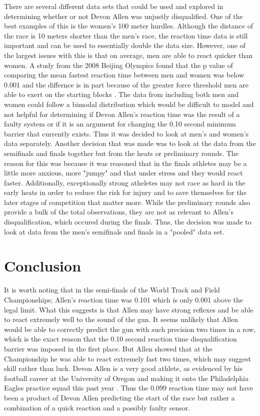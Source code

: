 \documentclass[12pt, letterpaper, titlepage]{article}
\begin{document}
There are several different data sets that could be used and explored in determining 
whether or not Devon Allen was unjustly disqualified.  One of the best examples of this
is the women's 100 meter hurdles. Although the distance of the race is 10 meters shorter
than the men's race, the reaction time data is still important and can be used to
essentially double the data size.  However, one of the largest issues with this is that on average, men are able to react quicker than women.  A study from the 2008 Beijing Olympics found that the p value of comparing the mean fastest reaction time between men and women was below 0.001 and the differnce is in part because of the greater force threshold men are able to exert on the starting blocks \citep{Lipps}. The data from including both men and women could follow a bimodal distribution which would be difficult to model and not helpful for determining if Devon Allen's reaction time was the result of a faulty system or if it is an argument
for changing the 0.10 second minimum barrier that currently exists.  Thus it was decided
to look at men's and women's data separately.  Another decision that was made was to look
at the data from the semifinals and finals together but from the heats or preliminary rounds.  The reason for this was because it was reasoned that in the finals athletes may
be a little more anxious, more "jumpy" and that under stress and they would react faster.
Additionally, exceptionally strong atheletes may not race as hard in the early heats in
order to reduce the risk for injury and to save themselves for the later stages of
competition that matter more. While the preliminary rounds also provide a bulk of the total observations, they are not as relevant to Allen's disqualification, which occured during the finals.  Thus, the decision was made to look at data from the men's semifinals
and finals in a "pooled" data set.



\section{Conclusion}
\label{sec:conclusion}
It is worth noting that in the semi-finals of the World Track and
Field Championships; Allen's reaction time was 0.101 which is only 0.001 above
the legal limit.  What this suggests is that Allen may have strong reflexes
and be able to react extremely well to the sound of the gun.  It seems unlikely that
Allen would be able to correctly predict the gun with such precision two times in a row,
which is the exact reason that the 0.10 second reaction time disqualification barrier was
imposed in the first place.  But Allen showed that at the Championship he was able to
react extremely fast two times, which may suggest skill rather than luck. Devon Allen is a very good athlete, as evidenced by his football career at the University of Oregon
and making it onto the Philadelphia Eagles practice squad this past year \citep{Hurley}.
Thus the 0.099 reaction time may not have been a product of Devon Allen
predicting the start of the race but rather a combination of a quick reaction 
and a possibly faulty sensor.
\end{document}
